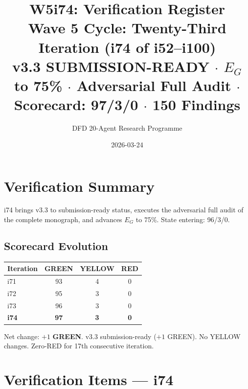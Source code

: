 \documentclass[11pt,a4paper]{article}
\title{\Large W5i74: Verification Register\\[6pt]
\normalsize Wave 5 Cycle: Twenty-Third Iteration (i74 of i52--i100)\\[6pt]
v3.3 SUBMISSION-READY $\cdot$ $E_G$ to 75\% $\cdot$ Adversarial Full Audit $\cdot$ Scorecard: 97/3/0 $\cdot$ 150 Findings}
\author{DFD 20-Agent Research Programme}
\date{2026-03-24}
\newcommand{\GREEN}{\textcolor{dfdgreen}{\textbf{GREEN}}}
\begin{document}
\maketitle

\section{Verification Summary}

i74 brings v3.3 to submission-ready status, executes the adversarial full audit of the complete monograph, and advances $E_G$ to 75\%. State entering: 96/3/0.

\subsection{Scorecard Evolution}

\begin{center}
\begin{tabular}{lccc}
\toprule
\textbf{Iteration} & \textbf{GREEN} & \textbf{YELLOW} & \textbf{RED} \\
\midrule
i71 & 93 & 4 & 0 \\
i72 & 95 & 3 & 0 \\
i73 & 96 & 3 & 0 \\
\textbf{i74} & \textbf{97} & \textbf{3} & \textbf{0} \\
\bottomrule
\end{tabular}
\end{center}

Net change: $+1$ \GREEN. v3.3 submission-ready ($+1$ GREEN). No YELLOW changes. Zero-RED for 17th consecutive iteration.

\section{Verification Items --- i74}
\end{document}
